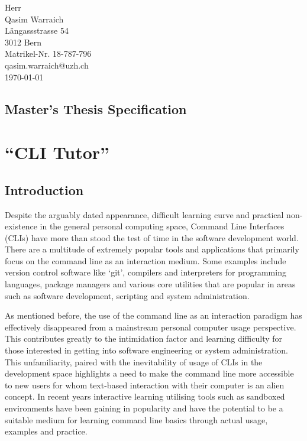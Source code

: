 \documentclass{task_description}
\begin{document}
\thispagestyle{firstpage}
\vspace*{23mm}%
\hfill\parbox[t]{65mm}{
Herr\\
Qasim Warraich\\
Längassstrasse 54\\
3012 Bern \\[3mm]
Matrikel-Nr. 18-787-796 \\
qasim.warraich@uzh.ch\\[15mm]
\today \\
}
\vspace*{5mm}

\subsection*{Master's Thesis Specification}

\section*{``CLI Tutor''}

\subsection*{Introduction}

Despite the arguably dated appearance, difficult learning curve and practical
non-existence in the general personal computing space, Command Line Interfaces
(CLIs) have more than stood the test of time in the software development world.
There are a multitude of extremely popular tools and applications that
primarily focus on the command line as an interaction medium. Some examples
include version control software like `git', compilers and interpreters for
programming languages, package managers and various core utilities that are
popular in areas such as software development, scripting and system
administration.

As mentioned before, the use of the command line as an interaction paradigm has
effectively disappeared from a mainstream personal computer usage perspective.
This contributes greatly to the intimidation factor and learning difficulty for
those interested in getting into software engineering or system administration.
This unfamiliarity, paired with the inevitability of usage of CLIs in the
development space highlights a need to make the command line more accessible to
new users for whom text-based interaction with their computer is an alien
concept. In recent years interactive learning utilising tools such as sandboxed
environments have been gaining in popularity and have the potential to be a
suitable medium for learning command line basics through actual usage, examples
and practice.
\end{document}
